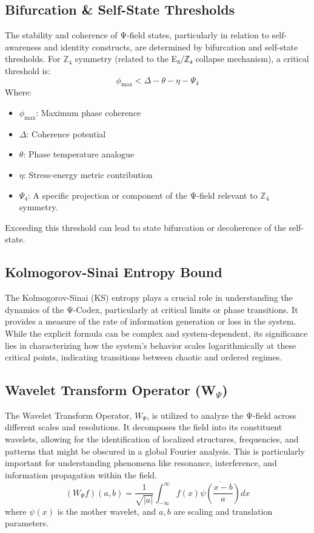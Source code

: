 \documentclass[11pt]{article}
\begin{document}
\subsection{Bifurcation \& Self-State Thresholds}
The stability and coherence of Ψ-field states, particularly in relation to self-awareness and identity constructs, are determined by bifurcation and self-state thresholds. For \( \mathbb{Z}_4 \) symmetry (related to the E₈/ℤ₄ collapse mechanism), a critical threshold is:
\[
\phi_{\text{max}} < \Delta - \theta - \eta - \Psi_4
\]
Where:
\begin{itemize}
    \item \( \phi_{\text{max}} \): Maximum phase coherence
    \item \( \Delta \): Coherence potential
    \item \( \theta \): Phase temperature analogue
    \item \( \eta \): Stress-energy metric contribution
    \item \( \Psi_4 \): A specific projection or component of the Ψ-field relevant to \( \mathbb{Z}_4 \) symmetry.
\end{itemize}
Exceeding this threshold can lead to state bifurcation or decoherence of the self-state.

\subsection{Kolmogorov-Sinai Entropy Bound}
The Kolmogorov-Sinai (KS) entropy plays a crucial role in understanding the dynamics of the Ψ-Codex, particularly at critical limits or phase transitions. It provides a measure of the rate of information generation or loss in the system. While the explicit formula can be complex and system-dependent, its significance lies in characterizing how the system's behavior scales logarithmically at these critical points, indicating transitions between chaotic and ordered regimes.

\subsection{Wavelet Transform Operator (W\(_\Psi\))}
The Wavelet Transform Operator, \( W_\Psi \), is utilized to analyze the Ψ-field across different scales and resolutions. It decomposes the field into its constituent wavelets, allowing for the identification of localized structures, frequencies, and patterns that might be obscured in a global Fourier analysis. This is particularly important for understanding phenomena like resonance, interference, and information propagation within the field.
\[
(W_\Psi f)(a,b) = \frac{1}{\sqrt{|a|}} \int_{-\infty}^{\infty} f(x) \overline{\psi\left(\frac{x-b}{a}\right)} dx
\]
where \( \psi(x) \) is the mother wavelet, and \(a, b\) are scaling and translation parameters.
\end{document}
